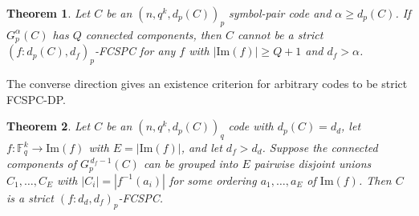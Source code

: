\documentclass[11pt,draftclsnofoot,journal,onecolumn]{IEEEtran}
\newtheorem{theorem}{Theorem}
\begin{document}
    \begin{theorem}\label{thm:alpha-components-nonexistence}
    Let $C$ be an $(n,q^k,d_p(C))_p$ symbol-pair code and $\alpha\ge d_p(C)$. If $G_p^{\alpha}(C)$ has $Q$ connected components, then $C$ cannot be a strict $(f:d_p(C),d_f)_p$-FCSPC for any $f$ with $|\mathrm{Im}(f)|\ge Q+1$ and $d_f>\alpha$.
    \end{theorem}
    

    The converse direction gives an existence criterion for arbitrary codes to be strict FCSPC-DP.

    \begin{theorem}\label{thm:pair-existence} 
    Let $C$ be an $(n,q^k,d_p(C))_q$ code with $d_p(C)=d_d$, let $f:\mathbb{F}_q^k\to\mathrm{Im}(f)$ with $E=|\mathrm{Im}(f)|$, and let $d_f>d_d$. Suppose the connected components of $G_p^{\,d_f-1}(C)$ can be grouped into $E$ pairwise disjoint unions $C_1,\dots,C_E$ with $|C_i|=|f^{-1}(a_i)|$ for some ordering $a_1,\dots,a_E$ of $\mathrm{Im}(f)$. Then $C$ is a strict $(f:d_d,d_f)_p$-FCSPC.
    \end{theorem}
\end{document}

